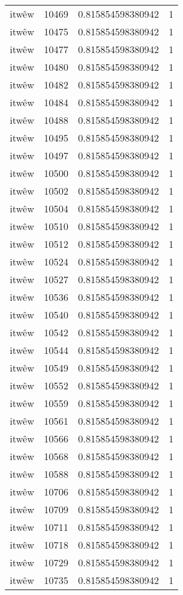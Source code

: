 \begin{longtable}{llll}
itwêw & 10469 & 0.815854598380942 & 1 \\
itwêw & 10475 & 0.815854598380942 & 1 \\
itwêw & 10477 & 0.815854598380942 & 1 \\
itwêw & 10480 & 0.815854598380942 & 1 \\
itwêw & 10482 & 0.815854598380942 & 1 \\
itwêw & 10484 & 0.815854598380942 & 1 \\
itwêw & 10488 & 0.815854598380942 & 1 \\
itwêw & 10495 & 0.815854598380942 & 1 \\
itwêw & 10497 & 0.815854598380942 & 1 \\
itwêw & 10500 & 0.815854598380942 & 1 \\
itwêw & 10502 & 0.815854598380942 & 1 \\
itwêw & 10504 & 0.815854598380942 & 1 \\
itwêw & 10510 & 0.815854598380942 & 1 \\
itwêw & 10512 & 0.815854598380942 & 1 \\
itwêw & 10524 & 0.815854598380942 & 1 \\
itwêw & 10527 & 0.815854598380942 & 1 \\
itwêw & 10536 & 0.815854598380942 & 1 \\
itwêw & 10540 & 0.815854598380942 & 1 \\
itwêw & 10542 & 0.815854598380942 & 1 \\
itwêw & 10544 & 0.815854598380942 & 1 \\
itwêw & 10549 & 0.815854598380942 & 1 \\
itwêw & 10552 & 0.815854598380942 & 1 \\
itwêw & 10559 & 0.815854598380942 & 1 \\
itwêw & 10561 & 0.815854598380942 & 1 \\
itwêw & 10566 & 0.815854598380942 & 1 \\
itwêw & 10568 & 0.815854598380942 & 1 \\
itwêw & 10588 & 0.815854598380942 & 1 \\
itwêw & 10706 & 0.815854598380942 & 1 \\
itwêw & 10709 & 0.815854598380942 & 1 \\
itwêw & 10711 & 0.815854598380942 & 1 \\
itwêw & 10718 & 0.815854598380942 & 1 \\
itwêw & 10729 & 0.815854598380942 & 1 \\
itwêw & 10735 & 0.815854598380942 & 1 \\

\end{longtable}

